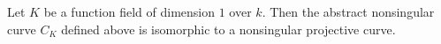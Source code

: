 Let $K$ be a function field of dimension $1$ over $k$. Then the abstract nonsingular curve $C_K$ defined above is isomorphic to a nonsingular projective curve.
